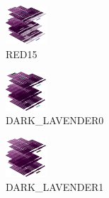 \hspace{0.1cm}
\begin{minipage}[b]{0.15\linewidth}
\begin{figure}[H]                                                          
  \centering                                                             
  \begin{adjustbox}{width=1.5cm,center}                                   
  \includegraphics[width=1.5cm]{src/colorspace_colourflow/flows/colourflow_79-45.png}%
  \end{adjustbox}                                                        
\caption*{RED15}                                           
\end{figure}                                                               
\end{minipage}
\hspace{0.1cm}
\begin{minipage}[b]{0.15\linewidth}
\begin{figure}[H]                                                          
  \centering                                                             
  \begin{adjustbox}{width=1.5cm,center}                                   
  \includegraphics[width=1.5cm]{src/colorspace_colourflow/flows/colourflow_80-45.png}%
  \end{adjustbox}                                                        
\caption*{DARK\_LAVENDER0}                                           
\end{figure}                                                               
\end{minipage}
\hspace{0.1cm}
\begin{minipage}[b]{0.15\linewidth}
\begin{figure}[H]                                                          
  \centering                                                             
  \begin{adjustbox}{width=1.5cm,center}                                   
  \includegraphics[width=1.5cm]{src/colorspace_colourflow/flows/colourflow_81-45.png}%
  \end{adjustbox}                                                        
\caption*{DARK\_LAVENDER1}                                           
\end{figure}                                                               
\end{minipage}
